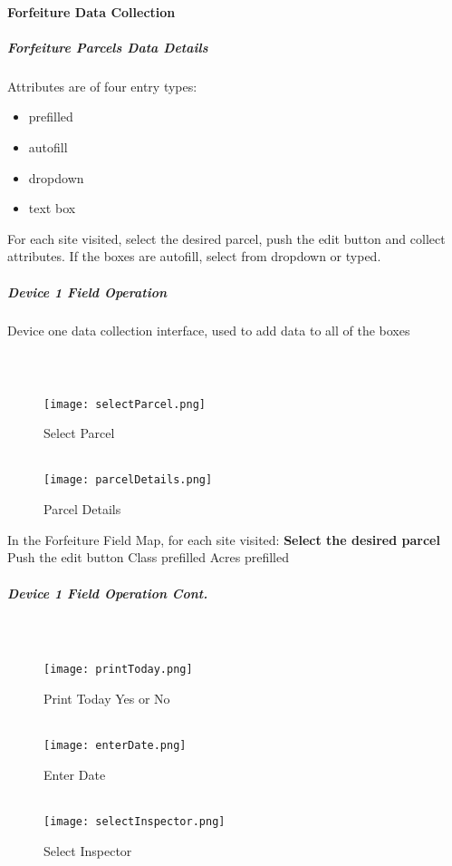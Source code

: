 \documentclass[class=article , crop=false, titlepage, twoside, multi={itemize, figure, verbatim}, float=false]{standalone}
\begin{document}
\paragraph{Forfeiture Data Collection}
\subparagraph{Forfeiture Parcels Data Details}
Attributes are of four entry types:\begin{itemize}
\item prefilled
\item autofill
\item dropdown
\item text box \end{itemize}
For each site visited, select the desired parcel, push the edit button and collect attributes.  If the boxes are autofill, select from dropdown or typed.\bigskip 
\clearpage
\subparagraph{Device 1 Field Operation}Device one data collection interface, used to add data to all of the boxes
\subparagraph*{\\}
\begin{wrapfigure}{r}{0.5\textwidth}
\centering
\texttt{[image: selectParcel.png]}
\caption {Select Parcel}
\vspace{.25in}
\HRule \\[.4cm] %
\vspace{.25in}
\texttt{[image: parcelDetails.png]}
\caption{Parcel Details}
\end{wrapfigure}
\vspace{1in}
In the Forfeiture Field Map, for each site visited:
\vspace{1in}
\textbf{Select the desired parcel}
\vspace{3in}
Push the \Large edit button 
\clearpage
Class prefilled
Acres prefilled
\clearpage
\subparagraph*{Device 1 Field Operation Cont.}
\subparagraph*{\\}
\begin{wrapfigure}{r}{0.5\textwidth}
\centering
\texttt{[image: printToday.png]}
\caption {Print Today Yes or No}
\vspace{.2in}
\HRule \\[.4cm] %
\vspace{.2in}
\texttt{[image: enterDate.png]}
\caption{Enter Date}
\vspace{.2in}
\HRule \\[.4cm] %
\vspace{.2in}
\texttt{[image: selectInspector.png]}
\caption{Select Inspector}
\end{wrapfigure}
\end{document}
